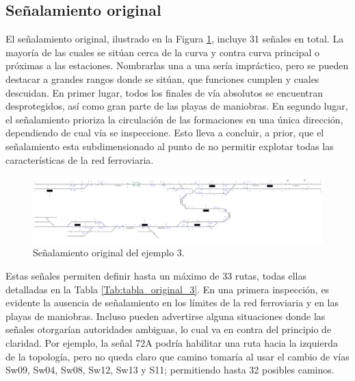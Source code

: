 \subsection{Señalamiento original}

    El señalamiento original, ilustrado en la Figura \ref{fig:EJ3_2}, incluye 31 señales en total. La mayoría de las cuales se sitúan cerca de la curva y contra curva principal o próximas a las estaciones. Nombrarlas una a una sería impráctico, pero se pueden destacar a grandes rangos donde se sitúan, que funciones cumplen y cuales descuidan. En primer lugar, todos los finales de vía absolutos se encuentran desprotegidos, así como gran parte de las playas de maniobras. En segundo lugar, el señalamiento prioriza la circulación de las formaciones en una única dirección, dependiendo de cual vía se inspeccione. Esto lleva a concluir, a prior, que el señalamiento esta subdimensionado al punto de no permitir explotar todas las características de la red ferroviaria.
    
    \begin{figure}[H]
    	\centering
    	\includegraphics[width=1\textwidth]{resultados-obtenidos/ejemplo3/images/3_original.png}
    	\centering\caption{Señalamiento original del ejemplo 3.}
    	\label{fig:EJ3_2}
    \end{figure}
    
    Estas señales permiten definir hasta un máximo de 33 rutas, todas ellas detalladas en la Tabla \ref{Tab:tabla_original_3}. En una primera inspección, es evidente la ausencia de señalamiento en los límites de la red ferroviaria y en las playas de maniobras. Incluso pueden advertirse alguna situaciones donde las señales otorgarían autoridades ambiguas, lo cual va en contra del principio de claridad. Por ejemplo, la señal 72A podría habilitar una ruta hacia la izquierda de la topología, pero no queda claro que camino tomaría al usar el cambio de vías Sw09, Sw04, Sw08, Sw12, Sw13 y S11; permitiendo hasta 32 posibles caminos.
    
